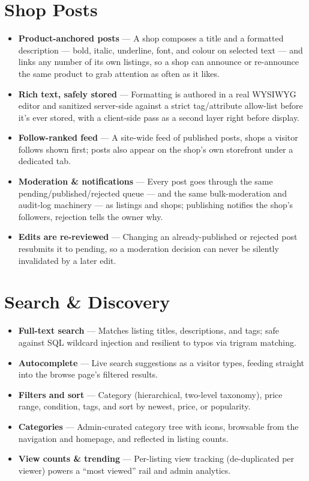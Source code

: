 \documentclass[11pt]{article}
\newcommand{\feature}[2]{%
  \item \textbf{#1} --- #2
}
\begin{document}
\section{Shop Posts}
\begin{itemize}
  \feature{Product-anchored posts}{A shop composes a title and a formatted description --- bold, italic, underline, font, and colour on selected text --- and links any number of its own listings, so a shop can announce or re-announce the same product to grab attention as often as it likes.}
  \feature{Rich text, safely stored}{Formatting is authored in a real WYSIWYG editor and sanitized server-side against a strict tag/attribute allow-list before it's ever stored, with a client-side pass as a second layer right before display.}
  \feature{Follow-ranked feed}{A site-wide feed of published posts, shops a visitor follows shown first; posts also appear on the shop's own storefront under a dedicated tab.}
  \feature{Moderation \& notifications}{Every post goes through the same pending/published/rejected queue --- and the same bulk-moderation and audit-log machinery --- as listings and shops; publishing notifies the shop's followers, rejection tells the owner why.}
  \feature{Edits are re-reviewed}{Changing an already-published or rejected post resubmits it to pending, so a moderation decision can never be silently invalidated by a later edit.}
\end{itemize}

\section{Search \& Discovery}
\begin{itemize}
  \feature{Full-text search}{Matches listing titles, descriptions, and tags; safe against SQL wildcard injection and resilient to typos via trigram matching.}
  \feature{Autocomplete}{Live search suggestions as a visitor types, feeding straight into the browse page's filtered results.}
  \feature{Filters and sort}{Category (hierarchical, two-level taxonomy), price range, condition, tags, and sort by newest, price, or popularity.}
  \feature{Categories}{Admin-curated category tree with icons, browsable from the navigation and homepage, and reflected in listing counts.}
  \feature{View counts \& trending}{Per-listing view tracking (de-duplicated per viewer) powers a ``most viewed'' rail and admin analytics.}
\end{itemize}
\end{document}
